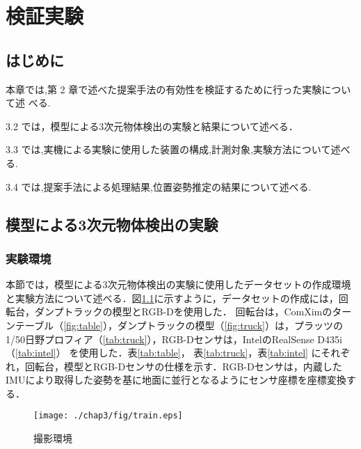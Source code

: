 \chapter{検証実験}
\thispagestyle{empty}
\label{chap3}
\minitoc

\newpage
\section{はじめに}
本章では,第 2 章で述べた提案手法の有効性を検証するために行った実験について述
べる.
\par
3.2 では，模型による3次元物体検出の実験と結果について述べる．
\par
3.3 では,実機による実験に使用した装置の構成,計測対象,実験方法について述べる.
\par
3.4 では,提案手法による処理結果,位置姿勢推定の結果について述べる.
\newpage

\section{模型による3次元物体検出の実験}
\subsection{実験環境}
本節では，模型による3次元物体検出の実験に使用したデータセットの作成環境と実験方法について述べる．図\ref{fig:tr}に示すように，データセットの作成には，回転台，ダンプトラックの模型とRGB-Dを使用した．
回転台は，ComXimのターンテーブル（\ref{fig:table}），ダンプトラックの模型（\ref{fig:truck}）は，プラッツの1/50日野プロフィア（\ref{tab:truck}），RGB-Dセンサは，IntelのRealSense D435i（\ref{tab:intel}） を使用した．表\ref{tab:table}，
表\ref{tab:truck}，表\ref{tab:intel}
にそれぞれ，回転台，模型とRGB-Dセンサの仕様を示す．RGB-Dセンサは，内蔵したIMUにより取得した姿勢を基に地面に並行となるようにセンサ座標を座標変換する．
\begin{figure}[b]
    \begin{center}
    \texttt{[image: ./chap3/fig/train.eps]}
    \caption{撮影環境}
    \label{fig:tr}
    \end{center}
\end{figure}

